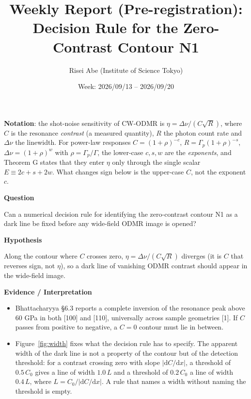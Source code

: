 \documentclass[11pt,a4paper]{ltjsarticle}
\title{Weekly Report (Pre-registration): Decision Rule for the Zero-Contrast Contour N1}
\author{Risei Abe (Institute of Science Tokyo)}
\date{Week: 2026/09/13 -- 2026/09/20}
\newcommand{\sectionblock}[1]{%
  \vspace{4mm}
  {\large\textbf{\textcolor{SciBlue}{#1}}}
  \vspace{2mm}

}
\begin{document}
\maketitle

\noindent
{\small\textcolor{SciBlue}{\textbf{Notation}}: the shot-noise sensitivity of CW-ODMR is \(\eta=\Delta\nu/(C\sqrt{R})\), where \(C\) is the resonance \emph{contrast} (a measured quantity), \(R\) the photon count rate and \(\Delta\nu\) the linewidth. For power-law responses \(C=(1+\rho)^{-c}\), \(R=\Gamma_p(1+\rho)^{-s}\), \(\Delta\nu=(1+\rho)^{w}\) with \(\rho=\Gamma_p/\Gamma\), the lower-case \(c,s,w\) are the \emph{exponents}, and Theorem G states that they enter \(\eta\) only through the single scalar \(E\equiv 2c+s+2w\). What changes sign below is the upper-case \(C\), not the exponent \(c\).}

\sectionblock{Question}

Can a numerical decision rule for identifying the zero-contrast contour N1 as a dark line be fixed before any wide-field ODMR image is opened?

\sectionblock{Hypothesis}

Along the contour where \(C\) crosses zero, \(\eta=\Delta\nu/(C\sqrt{R})\) diverges (it is \(C\) that reverses sign, not \(\eta\)), so a dark line of vanishing ODMR contrast should appear in the wide-field image.

\sectionblock{Evidence / Interpretation}

\begin{itemize}[leftmargin=8mm]
  \item Bhattacharyya \S6.3 reports a complete inversion of the resonance peak above 60 GPa in both [100] and [110], universally across sample geometries [1]. If \(C\) passes from positive to negative, a \(C=0\) contour must lie in between.
  \item Figure~\ref{fig:width} fixes what the decision rule has to specify. The apparent width of the dark line is not a property of the contour but of the detection threshold: for a contrast crossing zero with slope \(|\mathrm{d}C/\mathrm{d}x|\), a threshold of \(0.5\,C_0\) gives a line of width \(1.0\,L\) and a threshold of \(0.2\,C_0\) a line of width \(0.4\,L\), where \(L=C_0/|\mathrm{d}C/\mathrm{d}x|\). A rule that names a width without naming the threshold is empty.
\end{itemize}
\end{document}
